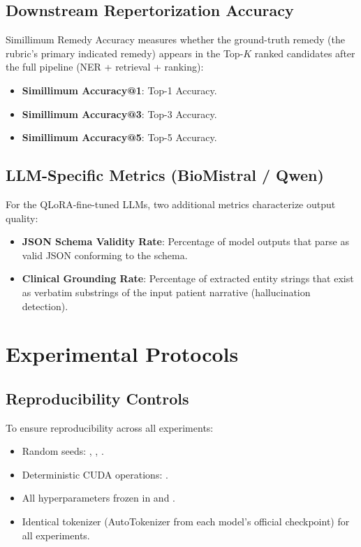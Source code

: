 \subsection{Downstream Repertorization Accuracy}

Simillimum Remedy Accuracy measures whether the ground-truth remedy (the rubric's primary indicated remedy) appears in the Top-$K$ ranked candidates after the full pipeline (NER + retrieval + ranking):
\begin{itemize}
  \item \textbf{Simillimum Accuracy@1}: Top-1 Accuracy.
  \item \textbf{Simillimum Accuracy@3}: Top-3 Accuracy.
  \item \textbf{Simillimum Accuracy@5}: Top-5 Accuracy.
\end{itemize}

\subsection{LLM-Specific Metrics (BioMistral / Qwen)}

For the QLoRA-fine-tuned LLMs, two additional metrics characterize output quality:
\begin{itemize}
  \item \textbf{JSON Schema Validity Rate}: Percentage of model outputs that parse as valid JSON conforming to the  schema.
  \item \textbf{Clinical Grounding Rate}: Percentage of extracted entity strings that exist as verbatim substrings of the input patient narrative (hallucination detection).
\end{itemize}


\section{Experimental Protocols}

\subsection{Reproducibility Controls}

To ensure reproducibility across all experiments:
\begin{itemize}
  \item Random seeds: , , .
  \item Deterministic CUDA operations: .
  \item All hyperparameters frozen in  and .
  \item Identical tokenizer (AutoTokenizer from each model's official checkpoint) for all experiments.
\end{itemize}

